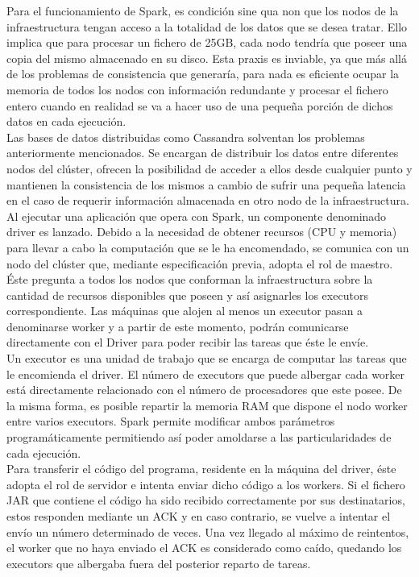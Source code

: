 Para el funcionamiento de Spark, es condición sine qua non que los nodos de la infraestructura tengan acceso a la totalidad de los datos que se desea tratar. Ello implica que para procesar un fichero de 25GB, cada nodo tendría que poseer una copia del mismo almacenado en su disco. Esta praxis es inviable, ya que más allá de los problemas de consistencia que generaría, para nada es eficiente ocupar la memoria de todos los nodos con información redundante y procesar el fichero entero cuando en realidad se va a hacer uso de una pequeña porción de dichos datos en cada ejecución.\\

Las bases de datos distribuidas como Cassandra solventan los problemas anteriormente mencionados. Se encargan de distribuir los datos entre diferentes nodos del clúster, ofrecen la posibilidad de acceder a ellos desde cualquier punto y mantienen la consistencia de los mismos a cambio de sufrir una pequeña latencia en el caso de requerir información almacenada en otro nodo de la infraestructura.\\ 

Al ejecutar una aplicación que opera con Spark, un componente denominado driver es lanzado. Debido a la necesidad de obtener recursos (CPU y memoria) para llevar a cabo la computación que se le ha encomendado, se comunica con un nodo del clúster que, mediante especificación previa, adopta el rol de maestro. Éste pregunta a todos los nodos que conforman la infraestructura sobre la cantidad de recursos disponibles que poseen y así asignarles los executors correspondiente. Las máquinas que alojen al menos un executor pasan a denominarse worker y a partir de este momento, podrán comunicarse directamente con el Driver para poder recibir las tareas que éste le envíe.\\

Un executor es una unidad de trabajo que se encarga de computar las tareas que le encomienda el driver. El número de executors que puede albergar cada worker está directamente relacionado con el número de procesadores que este posee. De la misma forma, es posible repartir la memoria RAM que dispone el nodo worker entre varios executors. Spark permite modificar ambos parámetros programáticamente permitiendo así poder amoldarse a las particularidades de cada ejecución.\\

Para transferir el código del programa, residente en la máquina del driver, éste adopta  el rol de servidor e intenta enviar dicho código a los workers. Si el fichero JAR que contiene el código ha sido recibido correctamente por sus destinatarios, estos responden mediante un ACK y en caso contrario, se vuelve a intentar el envío un número determinado de veces. Una vez llegado al máximo de reintentos, el worker que no haya enviado el ACK es considerado como caído, quedando los executors que albergaba fuera del posterior reparto de tareas.\\

